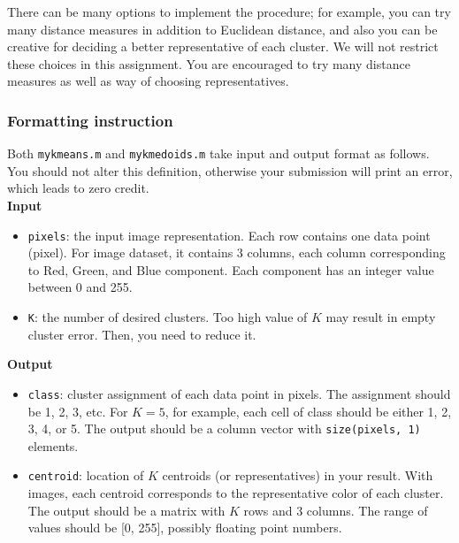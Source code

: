 \documentclass[twoside,10pt]{article}
\begin{document}
There can be many options to implement the procedure; for example, you can try many distance measures in addition to Euclidean distance, and also you can be creative for deciding a better representative of each cluster. We will not restrict these choices in this assignment. You are encouraged to try many distance measures as well as way of choosing representatives.


\subsubsection*{Formatting instruction}

Both \texttt{mykmeans.m} and \texttt{mykmedoids.m} take input and output format as follows. You should not alter this definition, otherwise your submission will print an error, which leads to zero credit.\\

\textbf{Input}
\begin{itemize}
  \item \texttt{pixels}: the input image representation. Each row contains one data point (pixel). For image dataset, it contains 3 columns, each column corresponding to Red, Green, and Blue component. Each component has an integer value between 0 and 255.
  \item \texttt{K}: the number of desired clusters. Too high value of $K$ may result in empty cluster error. Then, you need to reduce it.
\end{itemize}

\textbf{Output}
\begin{itemize}
  \item \texttt{class}: cluster assignment of each data point in pixels. The assignment should be 1, 2, 3, etc. For $K = 5$, for example, each cell of class should be either 1, 2, 3, 4, or 5. The output should be a column vector with \texttt{size(pixels, 1)} elements.
  \item \texttt{centroid}: location of $K$ centroids (or representatives) in your result. With images, each centroid corresponds to the representative color of each cluster. The output should be a matrix with $K$ rows and 3 columns. The range of values should be [0, 255], possibly floating point numbers.
\end{itemize}
\end{document}
